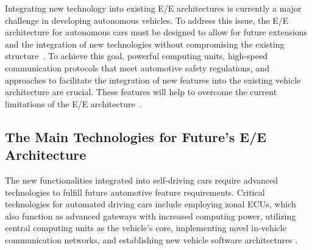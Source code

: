 
    Integrating new technology into existing E/E architectures is currently a major challenge in developing autonomous vehicles. To address this issue, the E/E architecture for autonomous cars must be designed to allow for future extensions and the integration of new technologies without compromising the existing structure~\cite{askaripoor2022architecture}. To achieve this goal, powerful computing units, high-speed communication protocols that meet automotive safety regulations, and approaches to facilitate the integration of new features into the existing vehicle architecture are crucial. These features will help to overcome the current limitations of the E/E architecture~\cite{9613692}.
    
    
    \subsection{The Main Technologies for Future's E/E Architecture}\label{future}
    
    
    The new functionalities integrated into self-driving cars require advanced technologies to fulfill future automotive feature requirements. Critical technologies for automated driving cars include employing zonal ECUs, which also function as advanced gateways with increased computing power, utilizing central computing units as the vehicle's core, implementing novel in-vehicle communication networks, and establishing new vehicle software architectures \cite{askaripoor2023designer}.

